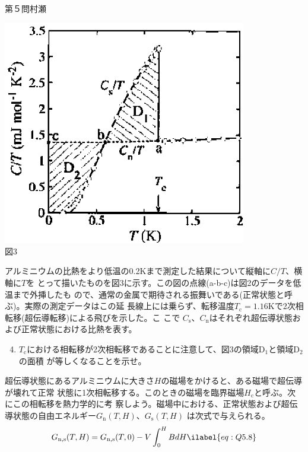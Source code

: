 \begin{question}{第５問}{村瀬}
\begin{center}
\begin{minipage}[t]{0.45\textwidth}
\begin{center}
    \end{center}
  \end{minipage}
  \begin{minipage}[t]{0.45\textwidth}
    \begin{center}
      \includegraphics[width=0.8\textwidth]{2006physQ5_3r.eps}\\図3
    \end{center}
  \end{minipage}
\end{center}
アルミニウムの比熱をより低温の0.2Kまで測定した結果について縦軸に$C/T$、横軸に$T$を
とって描いたものを図3に示す。この図の点線(a-b-c)は図2のデータを低温まで外挿したも
ので、通常の金属で期待される振舞いである(正常状態と呼ぶ)。実際の測定データはこの延
長線上には乗らず、転移温度$T_\mathrm{c}=1.16$Kで2次相転移(超伝導転移)による飛びを示した。こ
こで $C_\mathrm{s}$、$C_\mathrm{n}$はそれぞれ超伝導状態および正常状態における比熱を表す。
\begin{enumerate}
\setcounter{enumi}{3}
\item
  $T_\mathrm{c}$における相転移が2次相転移であることに注意して、図3の領域D$_1$と領域D$_2$の面積
  が等しくなることを示せ。
\end{enumerate}
超伝導状態にあるアルミニウムに大きさ$H$の磁場をかけると、ある磁場で超伝導が壊れて正常
状態に1次相転移する。このときの磁場を臨界磁場$H_\mathrm{c}$と呼ぶ。次にこの相転移を熱力学的に考
察しよう。磁場中における、正常状態および超伝導状態の自由エネルギー$G_\mathrm{n}(T,H)$、$G_\mathrm{s}(T,H)$
は次式で与えられる。
\begin{align}
  G_{\mathrm{n},\mathrm{s}}(T,H)
  = G_{\mathrm{n},\mathrm{s}}(T,0) - V\int_0^H BdH \ilabel{eq:Q5.8}

\end{align}
\end{question}
